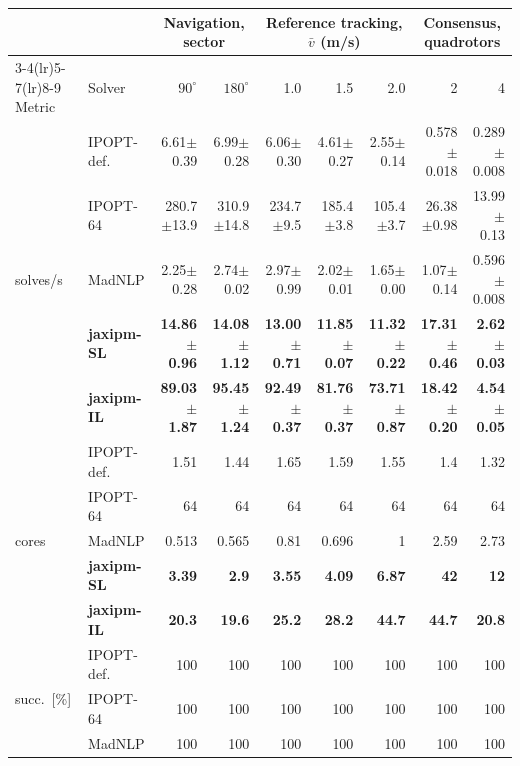 \begin{table}[p]
\centering\setlength{\tabcolsep}{1.7pt}\renewcommand{\arraystretch}{0.94}
{\scriptsize
\begin{tabular}{@{}l l r r r r r r r@{}}
\toprule
& & \multicolumn{2}{c}{Navigation, sector} & \multicolumn{3}{c}{Reference tracking, $\bar{v}$ (m/s)} & \multicolumn{2}{c}{Consensus, quadrotors} \\
\cmidrule(lr){3-4}\cmidrule(lr){5-7}\cmidrule(lr){8-9}
Metric & Solver & $90^\circ$ & $180^\circ$ & 1.0 & 1.5 & 2.0 & 2 & 4 \\
\midrule
\multirow{5}{*}{solves/s} & IPOPT-def. & 6.61$\pm$0.39 & 6.99$\pm$0.28 & 6.06$\pm$0.30 & 4.61$\pm$0.27 & 2.55$\pm$0.14 & 0.578$\pm$0.018 & 0.289$\pm$0.008 \\
 & IPOPT-64 & 280.7$\pm$13.9 & 310.9$\pm$14.8 & 234.7$\pm$9.5 & 185.4$\pm$3.8 & 105.4$\pm$3.7 & 26.38$\pm$0.98 & 13.99$\pm$0.13 \\
 & MadNLP & 2.25$\pm$0.28 & 2.74$\pm$0.02 & 2.97$\pm$0.99 & 2.02$\pm$0.01 & 1.65$\pm$0.00 & 1.07$\pm$0.14 & 0.596$\pm$0.008 \\
 & \textbf{jaxipm-SL} & \textbf{14.86$\pm$0.96} & \textbf{14.08$\pm$1.12} & \textbf{13.00$\pm$0.71} & \textbf{11.85$\pm$0.07} & \textbf{11.32$\pm$0.22} & \textbf{17.31$\pm$0.46} & \textbf{2.62$\pm$0.03} \\
 & \textbf{jaxipm-IL} & \textbf{89.03$\pm$1.87} & \textbf{95.45$\pm$1.24} & \textbf{92.49$\pm$0.37} & \textbf{81.76$\pm$0.37} & \textbf{73.71$\pm$0.87} & \textbf{18.42$\pm$0.20} & \textbf{4.54$\pm$0.05} \\
\midrule
\multirow{5}{*}{cores} & IPOPT-def. & 1.51 & 1.44 & 1.65 & 1.59 & 1.55 & 1.4 & 1.32 \\
 & IPOPT-64 & 64 & 64 & 64 & 64 & 64 & 64 & 64 \\
 & MadNLP & 0.513 & 0.565 & 0.81 & 0.696 & 1 & 2.59 & 2.73 \\
 & \textbf{jaxipm-SL} & \textbf{3.39} & \textbf{2.9} & \textbf{3.55} & \textbf{4.09} & \textbf{6.87} & \textbf{42} & \textbf{12} \\
 & \textbf{jaxipm-IL} & \textbf{20.3} & \textbf{19.6} & \textbf{25.2} & \textbf{28.2} & \textbf{44.7} & \textbf{44.7} & \textbf{20.8} \\
\midrule
\multirow{5}{*}{succ.\ [\%]} & IPOPT-def. & 100 & 100 & 100 & 100 & 100 & 100 & 100 \\
 & IPOPT-64 & 100 & 100 & 100 & 100 & 100 & 100 & 100 \\
 & MadNLP & 100 & 100 & 100 & 100 & 100 & 100 & 100 \\

\end{tabular}}
\end{table}
